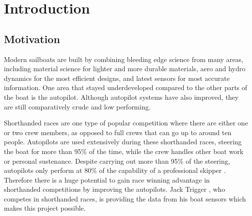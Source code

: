 \documentclass[12pt,twoside]{report}
\date{September 2021}
\begin{document}



\pagestyle{fancy}

\tableofcontents 


\clearpage{\pagestyle{empty}%
}
\fancyhead[LE,RO]{\slshape \rightmark}
\fancyhead[LO,RE]{\slshape \leftmark}


\chapter{Introduction}

\section{Motivation}
Modern sailboats are built by combining bleeding edge science from many areas, including material science for lighter and more durable materials, aero and hydro dynamics for the most efficient designs, and latest sensors for most accurate information. One area that stayed underdeveloped compared to the other parts of the boat is the autopilot. Although autopilot systems have also improved, they are still comparatively crude and low performing.

Shorthanded races are one type of popular competition where there are either one or two crew members, as opposed to full crews that can go up to around ten people. Autopilots are used extensively during these shorthanded races, steering the boat for more than 95\% of the time, while the crew handles other boat work or personal sustenance. Despite carrying out more than 95\% of the steering, autopilots only perform at 80\% of the capability of a professional skipper \cite{trigger-racing}. Therefore there is a huge potential to gain race winning advantage in shorthanded competitions by improving the autopilots. Jack Trigger \cite{trigger-racing}, who competes in shorthanded races, is providing the data from his boat sensors which makes this project possible. 
\end{document}
